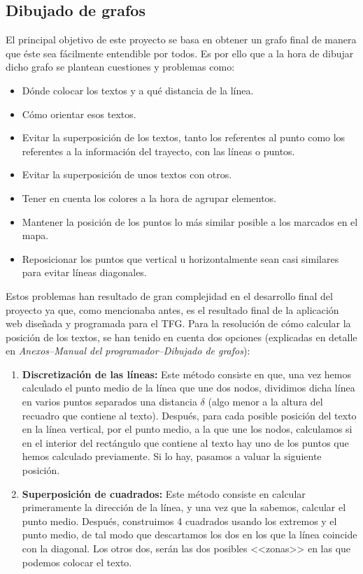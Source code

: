 \subsection{Dibujado de grafos}\label{sub:dibujar-grafo-svg}
El principal objetivo de este proyecto se basa en obtener un grafo final de manera que éste sea fácilmente entendible por todos. Es por ello que a la hora de dibujar dicho grafo se plantean cuestiones y problemas como:
\begin{itemize}
	\item Dónde colocar los textos y a qué distancia de la línea.
	\item Cómo orientar esos textos.
	\item Evitar la superposición de los textos, tanto los referentes al punto como los referentes a la información del trayecto, con las líneas o puntos.
	\item Evitar la superposición de unos textos con otros.
	\item Tener en cuenta los colores a la hora de agrupar elementos.
	\item Mantener la posición de los puntos lo más similar posible a los marcados en el mapa.
	\item Reposicionar los puntos que vertical u horizontalmente sean casi similares para evitar líneas diagonales.
\end{itemize}

Estos problemas han resultado de gran complejidad en el desarrollo final del proyecto ya que, como mencionaba antes, es el resultado final de la aplicación web diseñada y programada para el TFG. Para la resolución de cómo calcular la posición de los textos, se han tenido en cuenta dos opciones (explicadas en detalle en \textit{Anexos--Manual del programador--Dibujado de grafos}):
\begin{enumerate}
	\item \textbf{Discretización de las líneas:} Este método consiste en que, una vez hemos calculado el punto medio de la línea que une dos nodos, dividimos dicha línea en varios puntos separados una distancia $\delta$ (algo menor a la altura del recuadro que contiene al texto). Después, para cada posible posición del texto en la línea vertical, por el punto medio, a la que une los nodos, calculamos si en el interior del rectángulo que contiene al texto hay uno de los puntos que hemos calculado previamente. Si lo hay, pasamos a valuar la siguiente posición.
	\item \textbf{Superposición de cuadrados:} Este método consiste en calcular primeramente la dirección de la línea, y una vez que la sabemos, calcular el punto medio. Después, construimos 4 cuadrados usando los extremos y el punto medio, de tal modo que descartamos los dos en los que la línea coincide con la diagonal. Los otros dos, serán las dos posibles <<zonas>> en las que podemos colocar el texto.
\end{enumerate}



